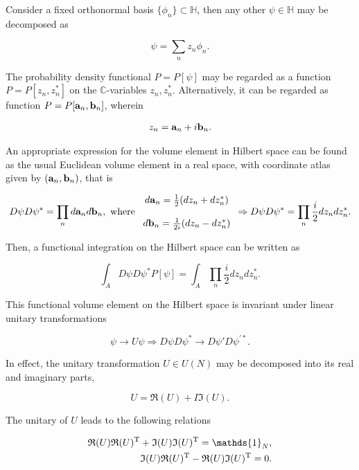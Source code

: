 \documentclass{homework}
\begin{document}

Consider a fixed orthonormal basis $\{\phi_n\} \subset \mathds{H}$, then any other $\psi \in \mathds{H}$ may be decomposed as 

$$
    \psi = \sum_{n} z_n \phi_n.
$$

The probability density functional $P = P[\psi]$ may be regarded as a function $P = P[z_n, z_n^*]$ on the $\mathds{C}$-variables $z_n, z_n^*$. Alternatively, it can be regarded as function $P = P[{\bf a}_n, {\bf b}_n]$, wherein 

\begin{align*}
    z_n = {\bf a}_n + i{\bf b}_n.
\end{align*}

An appropriate expression for the volume element in Hilbert space can be found as the usual Euclidean volume element in a real space, with coordinate atlas given by $({\bf a}_n,{\bf b}_n)$, that is 

$$
    D\psi D\psi^* = \prod_{n} d{\bf a}_n d{\bf b}_n, \textnormal{ where } \begin{array}{c}
        d{\bf a}_n = \frac{1}{2} (dz_n + dz_n^*)  \\
        \\
        d{\bf b}_n = \frac{1}{2i} (dz_n - dz_n^*)  
    \end{array} \Rightarrow D\psi D\psi^* = \prod_{n} \frac{i}{2} dz_n dz_n^*.
$$

Then, a functional integration on the Hilbert space can be written as 

$$
    \int_{A} D\psi D\psi^* P[\psi] = \int_{A} \prod_{n} \frac{i}{2} dz_n dz_n^*.
$$

This functional volume element on the Hilbert space is invariant under linear unitary transformations 

$$
    \psi \rightarrow U \psi \Rightarrow D\psi D\psi^*  \rightarrow D\psi' D\psi^{'*}. 
$$

In effect, the unitary transformation $U \in U(N)$ may be decomposed into its real and imaginary parts, 

$$
    U = \mathfrak{R}(U) + I \mathfrak{I}(U).
$$

The unitary of $U$ leads to the following relations 

\begin{align}
    \mathfrak{R}(U) \mathfrak{R}(U)^{\textnormal{T}} + \mathfrak{I}(U)\mathfrak{I}(U)^{\textnormal{T}} = \mathds{1}_N, \\
    \mathfrak{I}(U) \mathfrak{R}(U)^{\textnormal{T}} - \mathfrak{R}(U)\mathfrak{I}(U)^{\textnormal{T}} = 0.
\end{align}
\end{document}
